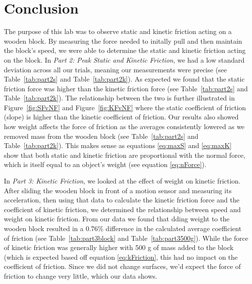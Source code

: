 
\section{Conclusion}

\vspace{-0.5cm}
\singlespacing

The purpose of this lab was to observe static and kinetic friction acting on a wooden block. By measuring the force needed to initally pull and then maintain the block's speed, we were able to determine the static and kinetic friction acting on the block. In \textit{Part 2: Peak Static and Kinetic Friction}, we had a low standard deviation across all our trials, meaning our measurements were precise (see Table~\ref{tab:part2s} and Table~\ref{tab:part2k}). As expected we found that the static friction force was higher than the kinetic friction force (see Table~\ref{tab:part2s} and Table~\ref{tab:part2k}). The relationship between the two is further illustrated in Figure~\ref{fig:SFvNF} and Figure~\ref{fig:KFvNF} where the static coefficient of friction (slope) is higher than the kinetic coefficient of friction. Our results also showed how weight affects the force of friction as the averages consistently lowered as we removed mass from the wooden block (see Table~\ref{tab:part2s} and Table~\ref{tab:part2k}). This makes sense as equations \ref{eq:maxS} and \ref{eq:maxK} show that both static and kinetic friction are proportional with the normal force, which is itself equal to an object's weight (see equation \ref{eq:nForce}). \par

In \textit{Part 3: Kinetic Friction}, we looked at the effect of weight on kinetic friction. After sliding the wooden block in front of a motion sensor and measuring its acceleration, then using that data to calculate the kinetic friction force and the coefficient of kinetic friction, we determined the relationship between speed and weight on kinetic friction. From our data we found that dding weight to the wooden block resulted in a 0.76\% difference in the calculated average coefficient of friction (see Table~\ref{tab:part3block} and Table~\ref{tab:part3500g}). While the force of kinetic friction was generally higher with 500 g of mass added to the block (which is expected based off equation \ref{eq:kFriction}, this had no impact on the coefficient of friction. Since we did not change surfaces, we'd expect the force of friction to change very little, which our data shows.
